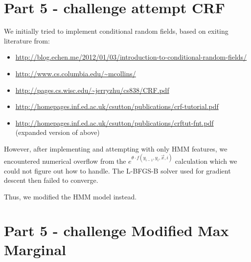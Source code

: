 \documentclass[12pt]{article}
\begin{document}
\pagebreak

\section{Part 5 - challenge attempt CRF}

We initially tried to implement conditional random fields, based on exiting literature from:
\begin{itemize}
\item \url{http://blog.echen.me/2012/01/03/introduction-to-conditional-random-fields/}
\item \url{http://www.cs.columbia.edu/~mcollins/}
\item \url{http://pages.cs.wisc.edu/~jerryzhu/cs838/CRF.pdf}
\item \url{http://homepages.inf.ed.ac.uk/csutton/publications/crf-tutorial.pdf}
\item \url{http://homepages.inf.ed.ac.uk/csutton/publications/crftut-fnt.pdf} \\
      (expanded version of above)
\end{itemize}

However, after implementing and attempting with only HMM features, we encountered numerical overflow from the \(e^{\theta \cdot f(y_{i-1}, y_i, \vec{x}, i)}\) calculation which we could not figure out how to handle. The L-BFGS-B solver used for gradient descent then failed to converge.

Thus, we modified the HMM model instead.

\section{Part 5 - challenge Modified Max Marginal}
\end{document}
